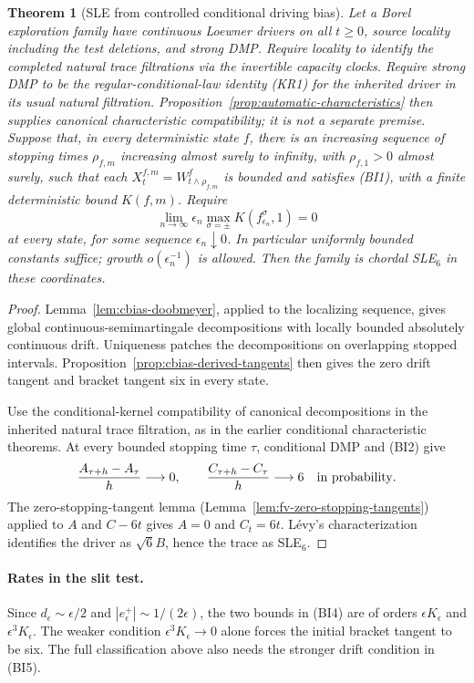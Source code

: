 \documentclass[11pt]{article}
\newtheorem{theorem}{Theorem}[section]
\theoremstyle{definition}\newtheorem{definition}[theorem]{Definition}
\theoremstyle{remark}\newtheorem{remark}[theorem]{Remark}
\begin{document}
\begin{theorem}[SLE from controlled conditional driving bias]
\label{thm:cbias-rigidity}
Let a Borel exploration family have continuous Loewner drivers on all
$t\ge0$, source locality including the test deletions, and strong DMP.
Require locality to identify the completed natural trace filtrations via
the invertible capacity clocks. Require strong DMP to be the regular-conditional-law identity (KR1)
for the inherited driver in its usual natural filtration.
Proposition~\ref{prop:automatic-characteristics} then supplies canonical
characteristic compatibility; it is not a separate premise. Suppose that, in every
deterministic state $f$, there is an increasing sequence of stopping times
$\rho_{f,m}$ increasing almost surely to infinity, with $\rho_{f,1}>0$ almost surely,
such that each $X^{f,m}_t=W^f_{t\wedge\rho_{f,m}}$ is bounded and
satisfies (BI1), with a finite deterministic bound $K(f,m)$. Require
\[
 \lim_{n\to\infty}\epsilon_n
          \max_{\sigma=\pm}K(f_{\epsilon_n}^\sigma,1)=0
 \tag{BI5}
\]
at every state, for some sequence $\epsilon_n\downarrow0$. In particular uniformly
bounded constants suffice; growth $o(\epsilon_n^{-1})$ is allowed.
Then the family is chordal SLE$_6$ in these coordinates.
\end{theorem}
\begin{proof}
Lemma~\ref{lem:cbias-doobmeyer}, applied to the localizing sequence, gives
global continuous-semimartingale decompositions with locally bounded
absolutely continuous drift. Uniqueness patches the decompositions on
overlapping stopped intervals. Proposition~\ref{prop:cbias-derived-tangents}
then gives the zero drift tangent and bracket tangent six in every state.

Use the conditional-kernel compatibility of canonical decompositions in
the inherited natural trace filtration, as in the earlier conditional
characteristic theorems. At every
bounded stopping time $\tau$, conditional DMP and (BI2) give
\[
 \frac{A_{\tau+h}-A_\tau}{h}\longrightarrow0,
 \qquad
 \frac{C_{\tau+h}-C_\tau}{h}\longrightarrow6
 \quad\hbox{in probability}.
\]
The zero-stopping-tangent lemma
(Lemma~\ref{lem:fv-zero-stopping-tangents}) applied to $A$ and $C-6t$
gives $A=0$ and $C_t=6t$. L\'evy's characterization identifies the
driver as $\sqrt6 B$, hence the trace as SLE$_6$.
\end{proof}

\paragraph{Rates in the slit test.}
Since $d_\epsilon\sim\epsilon/2$ and
$|e_\epsilon^+|\sim1/(2\epsilon)$, the two bounds in (BI4)
are of orders $\epsilon K_\epsilon$ and
$\epsilon^3 K_\epsilon$. The weaker condition
$\epsilon^3K_\epsilon\to0$ alone forces the initial bracket tangent
to be six. The full classification above also needs the stronger drift
condition in (BI5).
\end{document}
